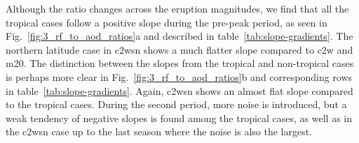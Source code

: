 \documentclass{ametsocV6.1}
\begin{document}
Although the ratio changes across the eruption magnitudes, we find that all the tropical
cases follow a positive slope during the pre-peak period, as seen in
Fig.~\ref{fig:3_rf_to_aod_ratios}a and described in table~\ref{tab:slope-gradients}. The
northern latitude case in \gls{c2wsn} shows a much flatter slope compared to \gls{c2w}
and \gls{m20}. The distinction between the slopes from the tropical and non-tropical
cases is perhaps more clear in Fig.~\ref{fig:3_rf_to_aod_ratios}b and corresponding rows
in table~\ref{tab:slope-gradients}. Again, \gls{c2wsn} shows an almost flat slope
compared to the tropical cases. During the second period, more noise is introduced, but
a weak tendency of negative slopes is found among the tropical cases, as well as in the
\gls{c2wsn} case up to the last season where the noise is also the largest.
\end{document}
